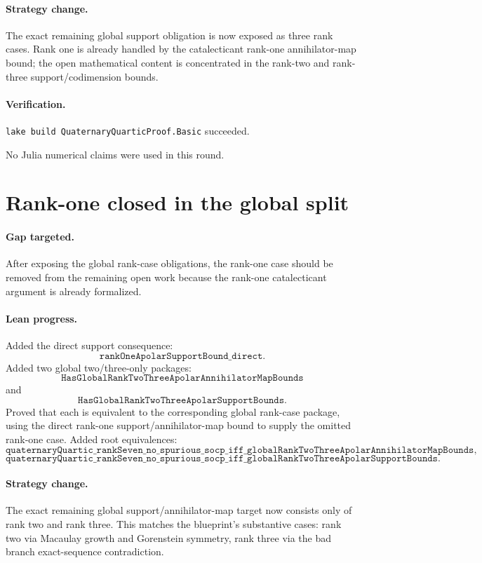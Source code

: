 \documentclass[11pt]{article}
\begin{document}
\paragraph{Strategy change.}
The exact remaining global support obligation is now exposed as three rank
cases.  Rank one is already handled by the catalecticant rank-one
annihilator-map bound; the open mathematical content is concentrated in the
rank-two and rank-three support/codimension bounds.

\paragraph{Verification.}
\texttt{lake build QuaternaryQuarticProof.Basic} succeeded.

No Julia numerical claims were used in this round.

\section*{Rank-one closed in the global split}

\paragraph{Gap targeted.}
After exposing the global rank-case obligations, the rank-one case should be
removed from the remaining open work because the rank-one catalecticant
argument is already formalized.

\paragraph{Lean progress.}
Added the direct support consequence:
\[
\texttt{rankOneApolarSupportBound\_direct}.
\]
Added two global two/three-only packages:
\[
\texttt{HasGlobalRankTwoThreeApolarAnnihilatorMapBounds}
\]
and
\[
\texttt{HasGlobalRankTwoThreeApolarSupportBounds}.
\]
Proved that each is equivalent to the corresponding global rank-case package,
using the direct rank-one support/annihilator-map bound to supply the omitted
rank-one case.  Added root equivalences:
\[
\texttt{quaternaryQuartic\_rankSeven\_no\_spurious\_socp\_iff\_globalRankTwoThreeApolarAnnihilatorMapBounds},
\]
\[
\texttt{quaternaryQuartic\_rankSeven\_no\_spurious\_socp\_iff\_globalRankTwoThreeApolarSupportBounds}.
\]

\paragraph{Strategy change.}
The exact remaining global support/annihilator-map target now consists only of
rank two and rank three.  This matches the blueprint's substantive cases:
rank two via Macaulay growth and Gorenstein symmetry, rank three via the bad
branch exact-sequence contradiction.
\end{document}
